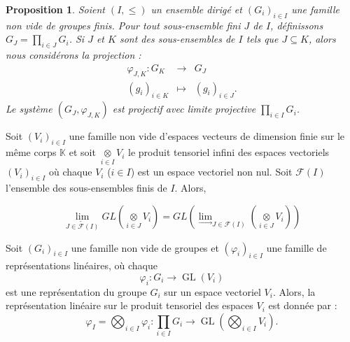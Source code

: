 \documentclass[9pt]{beamer}
\newtheorem{proposition}{Proposition}
\begin{document}
\begin{frame}
	\begin{proposition}
Soient $(I, \leq)$ un ensemble dirigé et $(G_i)_{i\in I}$ une famille non vide de groupes finis. Pour tout sous-ensemble fini $J$ de $I$, définissons $G_J = \underset{i\in J}\prod G_i$. Si $J$ et $K$ sont des sous-ensembles de $I$ tels que $J\subseteq K$, alors nous considérons la projection :
	$$\begin{array}{rlll}\varphi_{J, K}: G_K&\longrightarrow &G_J\\
		(g_i)_{i\in K}&\longmapsto&(g_i)_{i\in J}.
	\end{array}
$$ Le système $(G_J,\varphi_{J, K})$ est projectif avec limite projective $\underset{i\in I} \prod G_i$.
	\end{proposition}
	
	\begin{lemma}
Soit $(V_i)_{i\in I}$ une famille non vide d'espaces vecteurs de dimension finie sur le même corps \( \mathbb{K} \) et soit \( \underset{i\in I}\otimes V_i \) le produit tensoriel infini des espaces vectoriels \( (V_i)_{i\in I} \) où chaque \( V_i \) (\( i \in I \)) est un espace vectoriel non nul. Soit \( \mathcal{F}(I) \) l'ensemble des sous-ensembles finis de \( I \). Alors, 
		
		\[
		\underset{\overleftarrow{J \in \mathcal{F}(I)}}{\lim} GL\left( \underset{i \in J}{\otimes} V_i \right) = GL\left( \underset{\longrightarrow}{\lim}_{J \in \mathcal{F}(I)} \left( \underset{i \in J}{\otimes} V_i \right) \right)
		\]
	\end{lemma}
	
\end{frame}


\begin{frame}
\begin{theorem} 
Soit \( (G_i)_{i \in I} \) une famille non vide de groupes et \( (\varphi_i)_{i \in I} \) une famille de représentations linéaires, où chaque  
	\[
	\varphi_i : G_i \to \operatorname{GL}(V_i)
	\]
	est une représentation du groupe \( G_i \) sur un espace vectoriel \( V_i \).  
	Alors, la représentation linéaire sur le produit tensoriel des espaces \( V_i \) est donnée par :
	\[
	\varphi_I = \bigotimes_{i \in I} \varphi_i : \prod_{i \in I} G_i \longrightarrow \operatorname{GL} \left( \bigotimes_{i \in I} V_i \right).
	\]
\end{theorem}
\end{frame}
\end{document}
